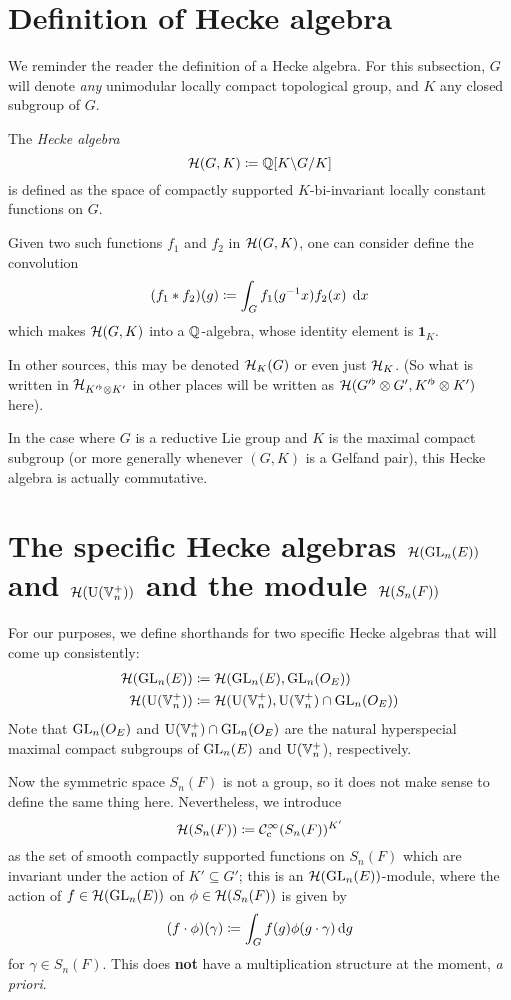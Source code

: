 \section{Definition of Hecke algebra}
We reminder the reader the definition of a Hecke algebra.
For this subsection, $G$ will denote \emph{any}
unimodular locally compact topological group,
and $K$ any closed subgroup of $G$.

\begin{definition}
  The \emph{Hecke algebra}
  \[ \mathcal H(G, K) \coloneqq \mathbb Q[K \backslash G \slash K] \]
  is defined as the space of compactly supported $K$-bi-invariant
  locally constant functions on $G$.

  Given two such functions $f_1$ and $f_2$ in $\mathcal H(G,K)$,
  one can consider define the convolution
  \[ (f_1 \ast f_2)(g) \coloneqq \int_G f_1(g\inv x) f_2(x) \; \odif x \]
  which makes $\mathcal H(G, K)$ into a $\mathbb Q$-algebra,
  whose identity element is $\mathbf{1}_K$.
\end{definition}

In other sources, this may be denoted $\mathcal H_K(G)$ or even just $\mathcal H_K$.
(So what is written in $\mathcal H_{K'^\flat \otimes K'}$ in other places
will be written as $\mathcal H(G'^\flat \otimes G', K'^\flat \otimes K')$ here).

In the case where $G$ is a reductive Lie group and
$K$ is the maximal compact subgroup
(or more generally whenever $(G,K)$ is a Gelfand pair),
this Hecke algebra is actually commutative.

\section{The specific Hecke algebras $\mathcal H(\operatorname{GL}_n(E))$ and $\mathcal H(\operatorname{U}(\mathbb V_n^+))$ and the module $\mathcal H(S_n(F))$}
For our purposes, we define shorthands for two specific Hecke algebras
that will come up consistently:
\begin{align*}
  \mathcal H(\operatorname{GL}_n(E)) &\coloneqq \mathcal H(\operatorname{GL}_n(E), \operatorname{GL}_n(O_E)) \\
  \mathcal H(\operatorname{U}(\mathbb V_n^+)) &\coloneqq \mathcal H(\operatorname{U}(\mathbb V_n^+), \operatorname{U}(\mathbb V_n^+) \cap \operatorname{GL}_n(O_E))
\end{align*}
Note that $\operatorname{GL}_n(O_E)$ and $\operatorname{U}(\mathbb V_n^+) \cap \operatorname{GL}_n(O_E)$
are the natural hyperspecial maximal compact subgroups of $\operatorname{GL}_n(E)$ and $\operatorname{U}(\mathbb V_n^+$),
respectively.

Now the symmetric space $S_n(F)$ is not a group,
so it does not make sense to define the same thing here.
Nevertheless, we introduce
\[ \mathcal H(S_n(F)) \coloneqq \mathcal C_{\mathrm{c}}^{\infty}(S_n(F))^{K'} \]
as the set of smooth compactly supported functions on $S_n(F)$
which are invariant under the action of $K' \subseteq G'$;
this is an $\mathcal H(\operatorname{GL}_n(E))$-module,
where the action of $f \in \mathcal H(\operatorname{GL}_n(E))$ on $\phi \in \mathcal H(S_n(F))$ is given by
\[ (f \cdot \phi)(\gamma) \coloneqq \int_G f(g) \phi(g \cdot \gamma) \odif g \]
for $\gamma \in S_n(F)$.
This does \textbf{not} have a multiplication structure at the moment, \emph{a priori}.

